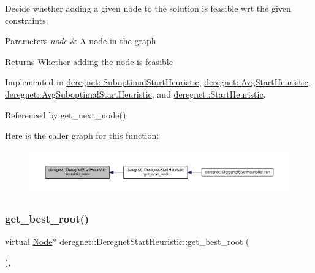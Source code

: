 Decide whether adding a given node to the solution is feasible wrt the given constraints. 


\begin{DoxyParams}{Parameters}
{\em node} & A node in the graph\\
\hline
\end{DoxyParams}
\begin{DoxyReturn}{Returns}
Whether adding the node is feasible 
\end{DoxyReturn}


Implemented in \hyperlink{classderegnet_1_1SuboptimalStartHeuristic_acbd151d7620495d80be8c63f1d3c4ecb}{deregnet\+::\+Suboptimal\+Start\+Heuristic}, \hyperlink{classderegnet_1_1AvgStartHeuristic_a3e18528bc735d47edcd719a72baf4e46}{deregnet\+::\+Avg\+Start\+Heuristic}, \hyperlink{classderegnet_1_1AvgSuboptimalStartHeuristic_aca3dd2ae41b88a0bd925b297d490e2cb}{deregnet\+::\+Avg\+Suboptimal\+Start\+Heuristic}, and \hyperlink{classderegnet_1_1StartHeuristic_a1d7931058aceb84790f861a39f0a8bfd}{deregnet\+::\+Start\+Heuristic}.



Referenced by get\+\_\+next\+\_\+node().

Here is the caller graph for this function\+:\nopagebreak
\begin{figure}[H]
\begin{center}
\leavevmode
\includegraphics[width=350pt]{classderegnet_1_1DeregnetStartHeuristic_ac296c4f122f7d3ad2fcc2cbb0d1b5379_icgraph}
\end{center}
\end{figure}
\mbox{\label{classderegnet_1_1DeregnetStartHeuristic_a372be86d0fb8ac94bd926a1f4d09e102}} 
\subsubsection{\texorpdfstring{get\+\_\+best\+\_\+root()}{get\_best\_root()}}
{\footnotesize\ttfamily virtual \hyperlink{namespacederegnet_a744bad34f2de9856d36715a445f027f3}{Node}$\ast$ deregnet\+::\+Deregnet\+Start\+Heuristic\+::get\+\_\+best\+\_\+root (\begin{DoxyParamCaption}{ }\end{DoxyParamCaption})\hspace{0.3cm}{\ttfamily [protected]}, {}}



